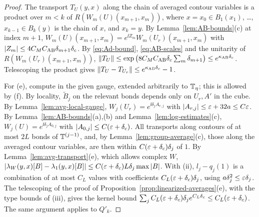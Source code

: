 \begin{proof}
The transport $T_U(y,x)$ along the chain of averaged contour variables is a product over $m<k$ of $R(W_m(U)(x_{m+1},x_m))$, where $x=x_0\in B_1(x_1)$, \dots, $x_{k-1}\in B_k(y)$ is the chain of $x$, and $x_k=y$. By Lemma~\ref{lem:AB-bounds}(c) at index $m+1$, $W_m(U)(x_{m+1},x_m)=e^{\ii Z_m}W_m(U_r)(x_{m+1},x_m)$ with $|Z_m|\le4C_MC_{\rm AB}\delta_{m+1}\delta_c$. By \eqref{eq:Ad-bound}, \eqref{eq:AB-scales} and the unitarity of $R(W_m(U_r)(x_{m+1},x_m))$, $\|T_U\|\le\exp\big(8C_MC_{\rm AB}\delta_c\sum_m\delta_{m+1}\big)\le e^{\kappa_{\rm AB}\delta_c}$. Telescoping the product gives $\|T_U-T_{U_r}\|\le e^{\kappa_{\rm AB}\delta_c}-1$.

For (e), compute in the given gauge, extended arbitrarily to $\mathbb T_\eta$; this is allowed by (f). By locality, $\tilde B_j$ on the relevant bonds depends only on $U_r,A'$ in the cube. By Lemma~\ref{lem:avg-local-gauge}, $W_j(U_r)=e^{\ii\delta_jA_{r,j}}$ with $|A_{r,j}|\le\varepsilon+32a\le C\varepsilon$. By Lemma~\ref{lem:AB-bounds}(a),(b) and Lemma~\ref{lem:log-estimates}(c), $W_j(U)=e^{\ii\delta_jA_{0,j}}$ with $|A_{0,j}|\le C(\varepsilon+\delta_c)$. All transports along contours of at most $2L$ bonds of $\mathbb T^{(j-1)}$, and, by Lemma~\ref{lem:group-average}(c), those along the averaged contour variables, are then within $C(\varepsilon+\delta_c)\delta_j$ of $1$. By Lemma~\ref{lem:avg-transport}(e), which allows complex $W$, $|\lambda_W(y,x)[B]-\lambda_1(y,x)[B]|\le C(\varepsilon+\delta_c)L\delta_j\max|B|$. With (ii), $l_j-q_j(1)$ is a combination of at most $C_L$ values with coefficients $C_L(\varepsilon+\delta_c)\delta_j$, using $a\delta_j^2\le\varepsilon\delta_j$. The telescoping of the proof of Proposition~\ref{prop:linearized-averages}(e), with the type bounds of (iii), gives the kernel bound $\sum_jC_L(\varepsilon+\delta_c)\delta_je^{C_L\delta_c}\le C_L(\varepsilon+\delta_c)$. The same argument applies to $Q'_k$.


\end{proof}
